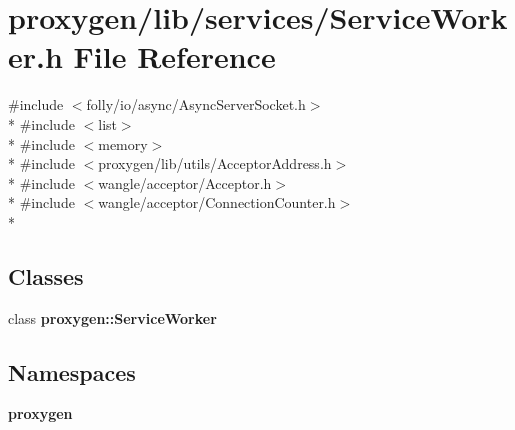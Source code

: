 \section{proxygen/lib/services/\+Service\+Worker.h File Reference}
\label{ServiceWorker_8h}
{\ttfamily \#include $<$folly/io/async/\+Async\+Server\+Socket.\+h$>$}\\*
{\ttfamily \#include $<$list$>$}\\*
{\ttfamily \#include $<$memory$>$}\\*
{\ttfamily \#include $<$proxygen/lib/utils/\+Acceptor\+Address.\+h$>$}\\*
{\ttfamily \#include $<$wangle/acceptor/\+Acceptor.\+h$>$}\\*
{\ttfamily \#include $<$wangle/acceptor/\+Connection\+Counter.\+h$>$}\\*
\subsection*{Classes}
\begin{DoxyCompactItemize}
\item 
class {\bf proxygen\+::\+Service\+Worker}
\end{DoxyCompactItemize}
\subsection*{Namespaces}
\begin{DoxyCompactItemize}
\item 
 {\bf proxygen}
\end{DoxyCompactItemize}
